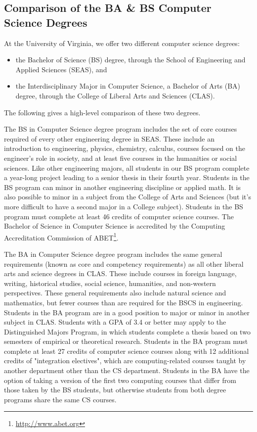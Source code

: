 \documentclass[10pt,letter]{book}
\newenvironment{itemlist}{
\begin{itemize}
\setlength{\itemsep}{0pt}
\setlength{\parskip}{0pt}}
{\end{itemize}}
\newcommand{\myurl}[1]{\footnote{\scriptsize\url{#1}}}
\begin{document}
\subsection{Comparison of the BA \& BS Computer Science
  Degrees}

At the University of Virginia, we offer two different computer science
degrees:

\begin{itemlist}
\item the Bachelor of Science (BS) degree, through the School of
  Engineering and Applied Sciences (SEAS), and
\item the Interdisciplinary Major in Computer Science, a Bachelor of
  Arts (BA) degree, through the College of Liberal Arts and Sciences
  (CLAS).
\end{itemlist}

The following gives a high-level comparison of these two degrees.

The BS in Computer Science degree program includes the set of core
courses required of every other engineering degree in SEAS. These
include an introduction to engineering, physics, chemistry, calculus,
courses focused on the engineer's role in society, and at least five
courses in the humanities or social sciences. Like other engineering
majors, all students in our BS program complete a year-long project
leading to a senior thesis in their fourth year. Students in the BS
program can minor in another engineering discipline or applied
math. It is also possible to minor in a subject from the College of
Arts and Sciences (but it's more difficult to have a second major in a
College subject). Students in the BS program must complete at least 46
credits of computer science courses. The Bachelor of Science in
Computer Science is accredited by the Computing Accreditation
Commission of ABET\myurl{http://www.abet.org}.

The BA in Computer Science degree program includes the same general
requirements (known as core and competency requirements) as all other
liberal arts and science degrees in CLAS. These include courses in
foreign language, writing, historical studies, social science,
humanities, and non-western perspectives. These general requirements
also include natural science and mathematics, but fewer courses than
are required for the BSCS in engineering. Students in the BA program
are in a good position to major or minor in another subject in
CLAS. Students with a GPA of 3.4 or better may apply to the
Distinguished Majors Program, in which students complete a thesis
based on two semesters of empirical or theoretical research. Students
in the BA program must complete at least 27 credits of computer
science courses along with 12 additional credits of "integration
electives", which are computing-related courses taught by another
department other than the CS department. Students in the BA have the
option of taking a version of the first two computing courses that
differ from those taken by the BS students, but otherwise students
from both degree programs share the same CS courses.
\end{document}
